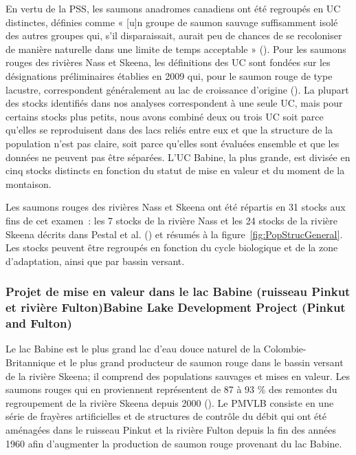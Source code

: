 \documentclass[french,11pt]{book}
\begin{document}
En vertu de la PSS, les saumons anadromes canadiens ont été regroupés en UC distinctes, définies comme « {[}u{]}n groupe de saumon sauvage suffisamment isolé des autres groupes qui, s'il disparaissait, aurait peu de chances de se recoloniser de manière naturelle dans une limite de temps acceptable » (). Pour les saumons rouges des rivières Nass et Skeena, les définitions des UC sont fondées sur les désignations préliminaires établies en 2009 qui, pour le saumon rouge de type lacustre, correspondent généralement au lac de croissance d'origine (). La plupart des stocks identifiés dans nos analyses correspondent à une seule UC, mais pour certains stocks plus petits, nous avons combiné deux ou trois UC soit parce qu'elles se reproduisent dans des lacs reliés entre eux et que la structure de la population n'est pas claire, soit parce qu'elles sont évaluées ensemble et que les données ne peuvent pas être séparées. L'UC Babine, la plus grande, est divisée en cinq stocks distincts en fonction du statut de mise en valeur et du moment de la montaison.

Les saumons rouges des rivières Nass et Skeena ont été répartis en 31 stocks aux fins de cet examen~: les 7 stocks de la rivière Nass et les 24 stocks de la rivière Skeena décrits dans Pestal et al. () et résumés à la figure~\ref{fig:PopStrucGeneral}. Les stocks peuvent être regroupés en fonction du cycle biologique et de la zone d'adaptation, ainsi que par bassin versant.

\subsubsection{Projet de mise en valeur dans le lac Babine (ruisseau Pinkut et rivière Fulton)Babine Lake Development Project (Pinkut and Fulton)}\label{projet-de-mise-en-valeur-dans-le-lac-babine-ruisseau-pinkut-et-riviuxe8re-fultonbabine-lake-development-project-pinkut-and-fulton}

Le lac Babine est le plus grand lac d'eau douce naturel de la Colombie-Britannique et le plus grand producteur de saumon rouge dans le bassin versant de la rivière Skeena; il comprend des populations sauvages et mises en valeur. Les saumons rouges qui en proviennent représentent de 87 à 93 \% des remontes du regroupement de la rivière Skeena depuis 2000 (). Le PMVLB consiste en une série de frayères artificielles et de structures de contrôle du débit qui ont été aménagées dans le ruisseau Pinkut et la rivière Fulton depuis la fin des années 1960 afin d'augmenter la production de saumon rouge provenant du lac Babine.
\end{document}
